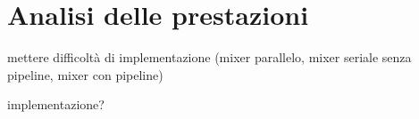 \chapter{Analisi delle prestazioni}
mettere difficoltà di implementazione
(mixer parallelo, mixer seriale senza pipeline, mixer con pipeline)

implementazione?
